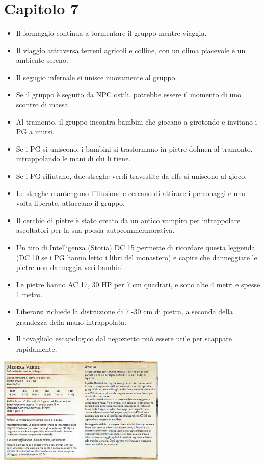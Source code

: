 \documentclass{article}
\begin{document}
\section{Capitolo 7}
\begin{itemize}
    \item Il formaggio continua a tormentare il gruppo mentre viaggia.
    \item Il viaggio attraversa terreni agricoli e colline, con un clima piacevole e un ambiente sereno.
    \item Il segugio infernale si unisce nuovamente al gruppo.
    \item Se il gruppo è seguito da NPC ostili, potrebbe essere il momento di uno scontro di massa.
    \item Al tramonto, il gruppo incontra bambini che giocano a girotondo e invitano i PG a unirsi.
    \item Se i PG si uniscono, i bambini si trasformano in pietre dolmen al tramonto, intrappolando le mani di chi li tiene.
    \item Se i PG rifiutano, due streghe verdi travestite da elfe si uniscono al gioco.
    \item Le streghe mantengono l'illusione e cercano di attirare i personaggi e una volta liberate, attaccano il gruppo.
    \item Il cerchio di pietre è stato creato da un antico vampiro per intrappolare ascoltatori per la sua poesia autocommermorativa.
    \item Un tiro di Intelligenza (Storia) DC 15 permette di ricordare questa leggenda (DC 10 se i PG hanno letto i libri del monastero) e capire che danneggiare le pietre non danneggia veri bambini.
    \item Le pietre hanno AC 17, 30 HP per 7 cm quadrati, e sono alte 4 metri e spesse 1 metro.
    \item Liberarsi richiede la distruzione di 7 -30 cm di pietra, a seconda della grandezza della mano intrappolata.
    \item Il tovagliolo escapologico dal negozietto può essere utile per scappare rapidamente.
\end{itemize}

\includegraphics[width=8cm, height = 4 cm]{../Mostri/Megera_verde.png}
\end{document}
